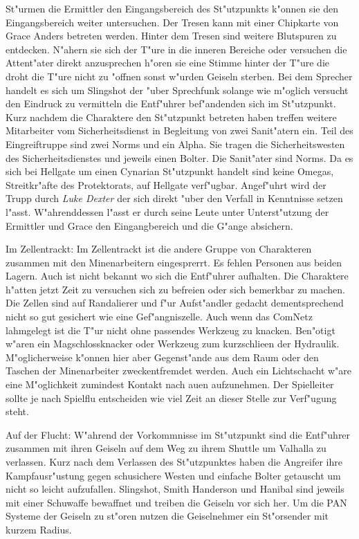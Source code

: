 St"urmen die Ermittler den Eingangsbereich des St"utzpunkts k"onnen sie den Eingangsbereich weiter untersuchen. Der Tresen kann mit einer Chipkarte von Grace Anders betreten werden. Hinter dem Tresen sind weitere Blutspuren zu entdecken. N"ahern sie sich der T"ure in die inneren Bereiche oder versuchen die Attent"ater direkt anzusprechen h"oren sie eine Stimme hinter der T"ure die droht die T"ure nicht zu "offnen sonst w"urden Geiseln sterben. Bei dem Sprecher handelt es sich um Slingshot der "uber Sprechfunk solange wie m"oglich versucht den Eindruck zu vermitteln die Entf"uhrer bef"andenden sich im St"utzpunkt. Kurz nachdem die Charaktere den St"utzpunkt betreten haben treffen  weitere Mitarbeiter vom Sicherheitsdienst in Begleitung von zwei Sanit"atern ein. Teil des Eingreiftruppe sind zwei Norms und ein Alpha. Sie tragen die Sicherheitswesten des Sicherheitsdienstes und jeweils einen Bolter. Die Sanit"ater sind Norms. Da es sich bei Hellgate um einen Cynarian St"utzpunkt handelt sind keine Omegas, Streitkr"afte des Protektorats, auf Hellgate verf"ugbar. Angef"uhrt wird der Trupp durch \emph{Luke Dexter} der sich direkt "uber den Verfall in Kenntnisse setzen l"asst. W"ahrenddessen l"asst er durch seine Leute unter Unterst"utzung der Ermittler und Grace den Eingangbereich und die G"ange absichern. 

Im Zellentrackt: Im Zellentrackt ist die andere Gruppe von Charakteren zusammen mit den Minenarbeitern eingesprerrt. Es fehlen Personen aus beiden Lagern. Auch ist nicht bekannt wo sich die Entf"uhrer aufhalten. Die Charaktere h"atten jetzt Zeit zu versuchen sich zu befreien oder sich bemerkbar zu machen. Die Zellen sind auf Randalierer und f"ur Aufst"andler gedacht dementsprechend nicht so gut gesichert wie eine Gef"angniszelle. Auch wenn das ComNetz lahmgelegt ist die T"ur nicht ohne passendes Werkzeug zu knacken. Ben"otigt w"aren ein Magschlossknacker oder Werkzeug zum kurzschlie\3en der Hydraulik. M"oglicherweise k"onnen hier aber Gegenst"ande aus dem Raum oder den 
Taschen der Minenarbeiter zweckentfremdet werden. Auch ein Lichtschacht w"are eine M"oglichkeit zumindest Kontakt nach au\3en aufzunehmen. 
Der Spielleiter sollte je nach Spielflu\3 entscheiden wie viel Zeit an dieser Stelle zur Verf"ugung steht.

Auf der Flucht: W"ahrend der Vorkommnisse im St"utzpunkt sind die Entf"uhrer zusammen mit ihren Geiseln auf dem Weg zu ihrem Shuttle um Valhalla zu verlassen. Kurz nach dem Verlassen des St"utzpunktes haben die Angreifer ihre Kampfausr"ustung gegen schu\3sichere Westen und einfache Bolter getauscht um nicht so leicht aufzufallen. Slingshot, Smith Handerson und Hanibal sind jeweils mit einer Schu\3waffe bewaffnet und treiben die Geiseln vor sich her. Um die PAN Systeme der Geiseln zu st"oren nutzen die Geiselnehmer ein St"orsender mit kurzem Radius.

